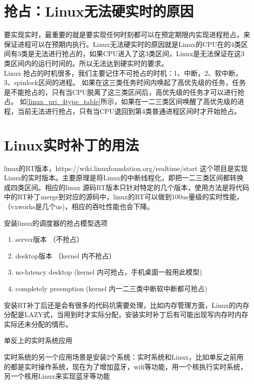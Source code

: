 \section{抢占：Linux无法硬实时的原因}
要实现实时，最重要的就是要实现任何时刻都可以在预定期限内实现进程抢占，来保证进程可以在预期内执行。Linux无法硬实时的原因就是Linux的CPU在的4类区间有3类是无法进行抢占的，如果CPU进入了这3类区间，Linux是无法保证在这3类区间内的运行时间的。所以无法达到硬实时的要求。\\Linux
抢占的时机很多，我们主要记住不可抢占的时机：1、中断，2、软中断，3、spinlock区间的进程。
如果在这三类任务时间内唤起了高优先级的任务，任务是不能抢占的，只有当CPU脱离了这三类区间后，高优先级的任务才可以进行抢占。
如\ref{linux_pri_4type_table}所示，如果在一二三类区间唤醒了高优先级的进程，当前无法进行抢占，只有当CPU退回到第4类普通进程区间时才开始抢占。

\section{Linux实时补丁的用法}
linux的RT版本，https://wiki.linuxfoundation.org/realtime/start 这个项目是实现Linux的实时版本。主要原理是将Linux的中断线程化，即把一二三类区间都转换成四类区间。相应的linux 源码RT版本只针对特定的几个版本，使用方法是将代码中的RT补丁merge到对应的源码中，linux的RT可以做到100us量级的实时性能，（vxworks是几个us)，相应的吞吐性能也会下降。

安装linux的调度器的抢占模型选项
\begin{enumerate}
  \item server版本 （不抢占）
  \item desktop版本 （kernel 内不抢占）
  \item no-latency desktop (kernel 内可抢占，手机桌面一般用此模型)
  \item completely preemption (kernel 内一二三类中断软中断都可抢占)
\end{enumerate}


安装RT补丁后还是会有很多的代码坑需要处理，比如内存管理方面，Linux的内存分配是LAZY式，当用到时才实际分配，安装实时补丁后有可能出现写内存时内存实际还未分配的情形。

\begin{example*}
  \wdexpbox
  {\caption{单反上的实时系统应用}}
  {实时系统的另一个应用场景是安装2个系统：实时系统和Linux，比如单反之前用的都是实时操作系统，现在为了增加蓝牙，wifi等功能，用一个核执行实时系统，另一个核用Linux来实现蓝牙等功能}
\end{example*}

